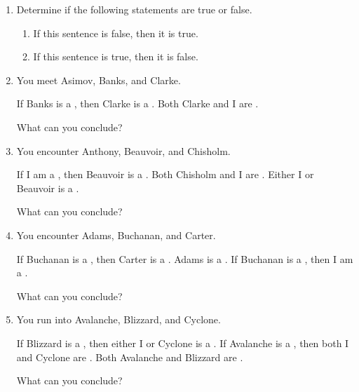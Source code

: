 \probsec{~\ref{sec:conditionals}}
\begin{enumerate}
    \item Determine if the following statements are true or false.
  \begin{enumerate}
      \item If this sentence is false, then it is true.
      \item If this sentence is true, then it is false.
  \end{enumerate}


    \item You meet Asimov, Banks, and Clarke.
  \begin{dialogue}
     If Banks is a \knight, then Clarke is a \knave.
     Both Clarke and I are \knaves.
  \end{dialogue}
  What can you conclude?

    \item You encounter Anthony, Beauvoir, and Chisholm.
  \begin{dialogue}
     If I am a \knave, then Beauvoir is a \knight.
     Both Chisholm and I are \knights.
     Either I or Beauvoir is a \knave.
  \end{dialogue}
  What can you conclude?

    \item You encounter Adams, Buchanan, and Carter.
  \begin{dialogue}
     If Buchanan is a \knight, then Carter is a \knave.
     Adams is a \knave.
     If Buchanan is a \knight, then I am a \knave.
  \end{dialogue}
  What can you conclude?

    \item You run into Avalanche, Blizzard, and Cyclone.
  \begin{dialogue}
     If Blizzard is a \knight, then either I or Cyclone is a \knave.
     If Avalanche is a \knave, then both I and Cyclone are \knights.
     Both Avalanche and Blizzard are \knaves.
  \end{dialogue}
  What can you conclude?


\end{enumerate}
